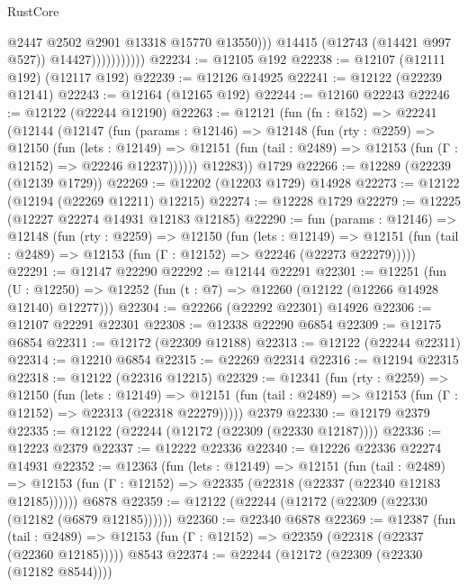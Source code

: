 \begin{lexlean}{RustCore}
\begin{coremodule}
                                @2447
                                @2502
                                @2901
                                @13318
                                @15770
                                @13550)))
                          @14415
                          (@12743 (@14421 @997 @527))
                          @14427)))))))))))
@22234 := @12105 @192
@22238 := @12107 (@12111 @192) (@12117 @192)
@22239 := @12126 @14925
@22241 := @12122 (@22239 @12141)
@22243 := @12164 (@12165 @192)
@22244 := @12160 @22243
@22246 := @12122 (@22244 @12190)
@22263 := @12121
    (fun (fn : @152) =>
    @22241
      (@12144
        (@12147
          (fun (params : @12146) =>
          @12148
            (fun (rty : @2259) =>
            @12150
              (fun (lets : @12149) =>
              @12151 (fun (tail : @2489) => @12153 (fun (Γ : @12152) => @22246 @12237))))))
        @12283))
    @1729
@22266 := @12289 (@22239 (@12139 @1729))
@22269 := @12202 (@12203 @1729) @14928
@22273 := @12122 (@12194 (@22269 @12211) @12215)
@22274 := @12228 @1729
@22279 := @12225 (@12227 @22274 @14931 @12183 @12185)
@22290 := fun (params : @12146) =>
  @12148
    (fun (rty : @2259) =>
    @12150
      (fun (lets : @12149) =>
      @12151 (fun (tail : @2489) => @12153 (fun (Γ : @12152) => @22246 (@22273 @22279)))))
@22291 := @12147 @22290
@22292 := @12144 @22291
@22301 := @12251
    (fun (U : @12250) => @12252 (fun (t : @7) => @12260 (@12122 (@12266 @14928 @12140) @12277)))
@22304 := @22266 (@22292 @22301) @14926
@22306 := @12107 @22291 @22301
@22308 := @12338 @22290 @6854
@22309 := @12175 @6854
@22311 := @12172 (@22309 @12188)
@22313 := @12122 (@22244 @22311)
@22314 := @12210 @6854
@22315 := @22269 @22314
@22316 := @12194 @22315
@22318 := @12122 (@22316 @12215)
@22329 := @12341
    (fun (rty : @2259) =>
    @12150
      (fun (lets : @12149) =>
      @12151 (fun (tail : @2489) => @12153 (fun (Γ : @12152) => @22313 (@22318 @22279)))))
    @2379
@22330 := @12179 @2379
@22335 := @12122 (@22244 (@12172 (@22309 (@22330 @12187))))
@22336 := @12223 @2379
@22337 := @12222 @22336
@22340 := @12226 @22336 @22274 @14931
@22352 := @12363
    (fun (lets : @12149) =>
    @12151
      (fun (tail : @2489) =>
      @12153 (fun (Γ : @12152) => @22335 (@22318 (@22337 (@22340 @12183 @12185))))))
    @6878
@22359 := @12122 (@22244 (@12172 (@22309 (@22330 (@12182 (@6879 @12185))))))
@22360 := @22340 @6878
@22369 := @12387
    (fun (tail : @2489) => @12153 (fun (Γ : @12152) => @22359 (@22318 (@22337 (@22360 @12185)))))
    @8543
@22374 := @22244 (@12172 (@22309 (@22330 (@12182 @8544))))

\end{coremodule}
\end{lexlean}
